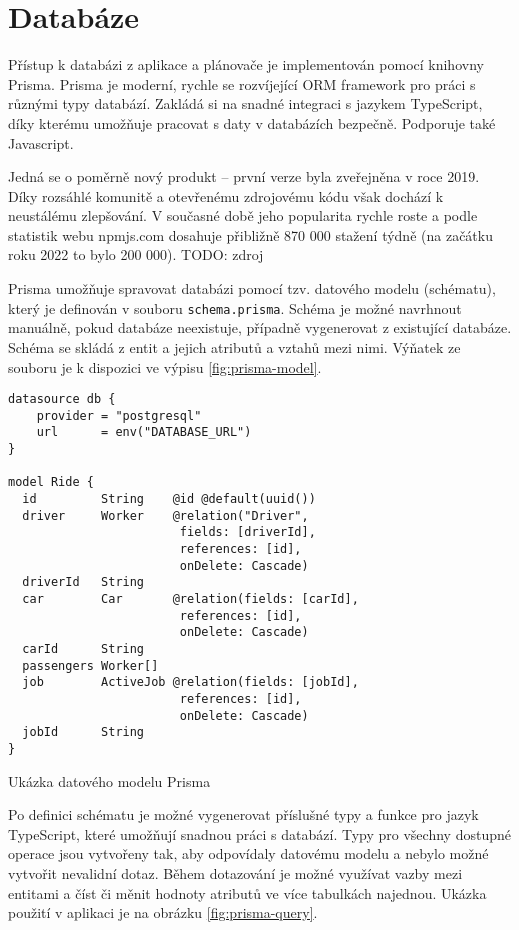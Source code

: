 \section{Databáze}

Přístup k databázi z aplikace a plánovače je implementován pomocí knihovny Prisma. Prisma je moderní, rychle se rozvíjející ORM framework pro práci s různými typy databází. 
Zakládá si na snadné integraci s jazykem TypeScript, díky kterému umožňuje pracovat s daty v databázích bezpečně. Podporuje také Javascript.

Jedná se o poměrně nový produkt -- první verze byla zveřejněna v roce 2019. 
Díky rozsáhlé komunitě a otevřenému zdrojovému kódu však dochází k neustálému zlepšování.
V současné době jeho popularita rychle roste a podle statistik webu npmjs.com dosahuje přibližně 870 000 stažení týdně (na začátku roku 2022 to bylo 200 000). TODO: zdroj

Prisma umožňuje spravovat databázi pomocí tzv. datového modelu (schématu), který je definován v souboru \texttt{schema.prisma}. 
Schéma je možné navrhnout manuálně, pokud databáze neexistuje, případně vygenerovat z existující databáze. Schéma se skládá z entit a jejich atributů a vztahů mezi nimi.
Výňatek ze souboru je k dispozici ve výpisu \ref{fig:prisma-model}.

\begin{listing}[h]
\begin{verbatim}
datasource db {
    provider = "postgresql"
    url      = env("DATABASE_URL")
}

model Ride {
  id         String    @id @default(uuid())
  driver     Worker    @relation("Driver",
                        fields: [driverId],
                        references: [id],
                        onDelete: Cascade)
  driverId   String
  car        Car       @relation(fields: [carId], 
                        references: [id],
                        onDelete: Cascade)
  carId      String
  passengers Worker[]
  job        ActiveJob @relation(fields: [jobId], 
                        references: [id],
                        onDelete: Cascade)
  jobId      String
}
\end{verbatim}
\caption{Ukázka datového modelu Prisma}
\label{fig:prisma-model}
\end{listing}

Po definici schématu je možné vygenerovat příslušné typy a funkce pro jazyk TypeScript, které umožňují snadnou práci s databází.
Typy pro všechny dostupné operace jsou vytvořeny tak, aby odpovídaly datovému modelu a nebylo možné vytvořit nevalidní dotaz.
Během dotazování je možné využívat vazby mezi entitami a číst či měnit hodnoty atributů ve více tabulkách najednou.
Ukázka použití v aplikaci je na obrázku \ref{fig:prisma-query}.

